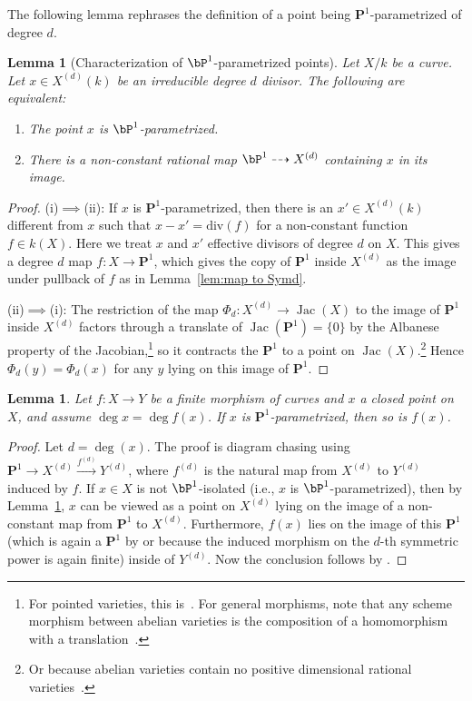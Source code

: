 \documentclass[11pt,reqno]{amsart}
\theoremstyle{plain}
\newtheorem{lemma}[theorem]{Lemma}
\theoremstyle{definition}
\newcommand{\PP}{\mathbf P}
\newcommand{\Jac}{\operatorname{Jac}}
\begin{document}
The following lemma rephrases the definition of a point being $\PP^1$-parametrized of degree $d$. 
\begin{lemma}[Characterization of $\bP^1$-parametrized points] \label{lem:iso1}
Let $X/k$ be a curve. Let $x \in X^{(d)}(k)$ be an irreducible degree $d$ divisor. The following are equivalent:
\begin{enumerate}
    \item The point $x$ is $\bP^1$-parametrized.

    \item There is a non-constant rational map $\bP^1 \dashrightarrow X^{(d)}$ containing $x$ in its image.
\end{enumerate}
\end{lemma}
\begin{proof}
(i)$\implies$(ii): If $x$ is $\PP^1$-parametrized, then there is an $x' \in X^{(d)}(k)$ different from $x$ such that 
$x-x'=\mathrm{div}(f)$ for a non-constant function $f\in k(X)$. Here we treat $x$ and $x'$ effective divisors of degree $d$ on $X$. This gives a degree $d$ map $f\colon X \to \PP^1$, which gives the copy of $\PP^1$ inside $X^{(d)}$ as the image under pullback of $f$ as in Lemma~\ref{lem:map to Symd}.  

(ii)$\implies$(i): 
The restriction of the map $\Phi_d\colon X^{(d)}\rightarrow \Jac(X)$ to the image of $\PP^1$ inside $X^{(d)}$ factors through a translate of $\Jac(\PP^1)=\{0\}$ by the Albanese property of the Jacobian,\footnote{For pointed varieties, this is~\cite[Proposition~6.1]{MilneJV}. For general morphisms, note that any scheme morphism between abelian varieties is the composition of a homomorphism with a translation~\cite[Corollary~3.6]{MilneAV}.} so it contracts the $\PP^1$ to a point on $\Jac(X)$.\footnote{Or because abelian varieties contain no positive dimensional rational varieties~\cite[Corollary~3.9]{MilneAV}.} Hence $\Phi_d(y) = \Phi_d(x)$ for any $y$ lying on this image of $\PP^1$.
\end{proof}

\begin{lemma} \label{lem:iso2}
Let $f\colon X\rightarrow Y$ be a finite morphism of curves and $x$ a closed point on $X$, and assume  $\deg x = \deg f(x)$. If $x$ is $\PP^1$-parametrized, then so is $f(x)$.
\end{lemma}
\begin{proof}
Let $d=\deg(x)$. The proof is diagram chasing using $\PP^1 \to X^{(d)}\stackrel{f^{(d)}}{\to} Y^{(d)}$, where $f^{(d)}$ is the natural map from $X^{(d)}$ to $Y^{(d)}$ induced by $f$.
If $x\in X$ is not $\bP^1$-isolated (i.e., $x$ is $\bP^1$-parametrized), then
by Lemma~\ref{lem:iso1}, $x$ can be viewed as a point on $X^{(d)}$ lying on the image of a non-constant map from $\PP^1$ to $X^{(d)}$.  
Furthermore, $f(x)$ lies on the image of this $\PP^1$ (which is again a $\PP^1$ by  or because the induced morphism on the $d$-th symmetric power is again finite) inside of $Y^{(d)}$. Now the conclusion follows by .
\end{proof}
\end{document}
